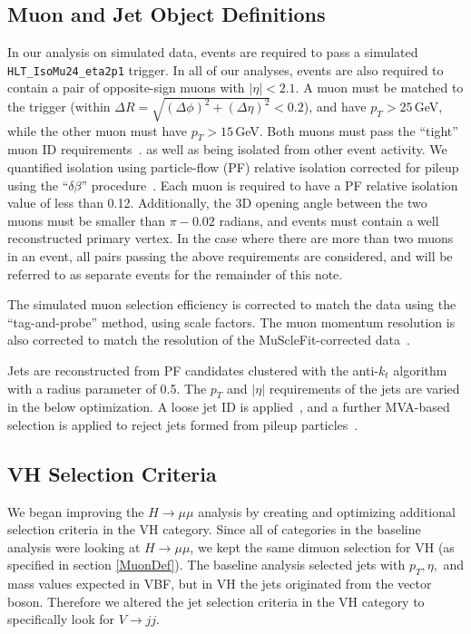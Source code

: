 \documentclass[12pt]{article}
\begin{document}
\subsection{Muon and Jet Object Definitions \label{MuonDef}}

In our analysis on simulated data, events are required to pass a simulated \texttt{HLT\_IsoMu24\_eta2p1} trigger.
In all of our analyses, events are also required to contain a pair of opposite-sign muons with $|\eta|<2.1$.
A muon must be matched to the trigger (within $\Delta R = \sqrt{(\Delta \phi)^2+(\Delta \eta)^2}< 0.2$), 
and have $p_T>25$\,GeV, while the other muon must have $p_T>15$\,GeV.
Both muons must pass the ``tight'' muon ID requirements~\cite{AN2012_459}.
as well as being isolated from other event activity.  We quantified isolation using
particle-flow (PF) relative isolation corrected for pileup using the ``$\delta \beta$''
procedure~\cite{AN2012_459}.  Each muon is required to have a PF relative isolation value
of less than 0.12.  Additionally, the 3D opening angle between the two muons must be
smaller than $\pi-0.02$ radians, and events must contain a well reconstructed primary
vertex.
In the case where there are more than two muons in an event, all pairs passing the above
requirements are considered, and will be referred to as separate events for the remainder
of this note.  

The simulated muon selection efficiency is corrected to match the data using 
the ``tag-and-probe'' method, using scale factors.  The muon momentum resolution
is also corrected to match the resolution of the MuScleFit-corrected data~\cite{AN2012_459}.

Jets are reconstructed from PF candidates clustered with the anti-$k_t$ algorithm with
a radius parameter of 0.5.  The $p_T$ and $|\eta|$ requirements of the jets are varied in
the below optimization.  A loose jet ID is applied~\cite{AN2012_459}, and a further
MVA-based selection is applied to reject jets formed from pileup particles~\cite{PUID}.

\subsection{VH Selection Criteria}

We began improving the $H \rightarrow \mu \mu$ analysis by creating and optimizing additional selection criteria in the VH category. 
Since all of categories in the baseline analysis were looking at $H \rightarrow \mu \mu$, we kept the same dimuon 
selection for VH (as specified in section \ref{MuonDef}). 
The baseline analysis selected jets with $p_{T}, \eta,$ and mass values expected in VBF, but in VH the jets originated from the vector boson. 
Therefore we altered the jet selection criteria in the VH category to specifically look for $V \rightarrow jj$.
\end{document}

